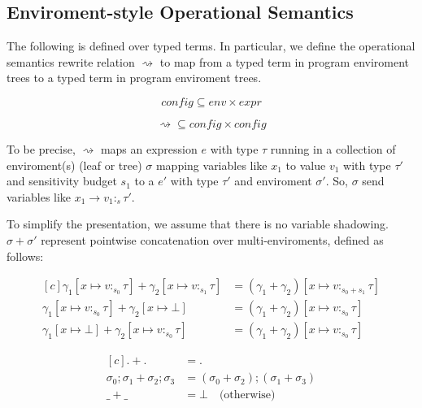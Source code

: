 \subsection{Enviroment-style Operational Semantics}
The following is defined over typed terms. In particular, we define the
operational semantics rewrite relation $\rightsquigarrow$ to map from a typed
term in program enviroment trees to a typed term in program enviroment trees. 

$$
\textit{config} \subseteq \textit{env} \times \textit{expr}
$$

$$
\rightsquigarrow \subseteq \textit{config} \times \textit{config}
$$

To be precise, $\rightsquigarrow$ maps an expression $e$ with type $\tau$
running in a collection of enviroment(s) (leaf or tree) $\sigma$ mapping
variables like $x_1$ to value $v_1$ with type $\tau'$ and sensitivity budget
$s_1$ to a $e'$ with type $\tau'$ and enviroment $\sigma'$. So, $\sigma$ send
variables like $x_1 \to v_1 :_s \tau'$.

To simplify the presentation, we assume that there is no variable shadowing.
$\sigma + \sigma'$ represent pointwise concatenation over multi-enviroments,
defined as follows:

\begin{definition}
  \begin{equation}
    \begin{aligned}[c]
      \gamma_1[x \mapsto v :_{s_0} \tau] 
        + 
      \gamma_2[x \mapsto v:_{s_1} \tau] 
        &= 
      (\gamma_1 + \gamma_2) [x \mapsto v :_{s_0 + s_1} \tau] \\
      \gamma_1[x \mapsto v :_{s_0} \tau] 
        + 
      \gamma_2[x \mapsto \bot] 
        &= 
      (\gamma_1 + \gamma_2) [x \mapsto v :_{s_0} \tau] \\
      \gamma_1[x \mapsto \bot] 
        + 
      \gamma_2[x \mapsto v :_{s_0} \tau] 
        &= 
      (\gamma_1 + \gamma_2) [x \mapsto v :_{s_0} \tau]
    \end{aligned}
  \end{equation}
\end{definition}

\begin{definition}
  \begin{equation}
    \begin{aligned}[c]
      . + . &=  . \\ 
      \sigma_0;\sigma_1 + \sigma_2;\sigma_3 &= (\sigma_0 + \sigma_2);(\sigma_1 + \sigma_3) \\ 
      \_ + \_ &= \bot \quad{\text{(otherwise)}}
    \end{aligned}
  \end{equation}
\end{definition}

